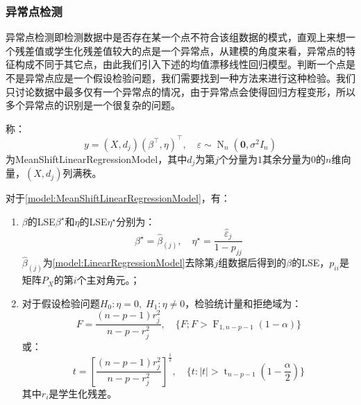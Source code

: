 \subsubsection{异常点检测}
\begin{note}
	异常点检测即检测数据中是否存在某一个点不符合该组数据的模式，直观上来想一个残差值或学生化残差值较大的点是一个异常点，从建模的角度来看，异常点的特征构成不同于其它点，由此我们引入下述的均值漂移线性回归模型。判断一个点是不是异常点应是一个假设检验问题，我们需要找到一种方法来进行这种检验。我们只讨论数据中最多仅有一个异常点的情况，由于异常点会使得回归方程变形，所以多个异常点的识别是一个很复杂的问题。
\end{note}
\begin{definition}\label{model:MeanShiftLinearRegressionModel}
	称：
	\begin{equation*}
		y=(X,d_j)(\beta^{\top},\eta)^{\top},\quad\varepsilon\sim\operatorname{N}_n(\mathbf{0},\sigma^2I_n)
	\end{equation*}
	为\gls{MeanShiftLinearRegressionModel}，其中$d_j$为第$j$个分量为$1$其余分量为$0$的$n$维向量，$(X,d_j)$列满秩。
\end{definition}
\begin{theorem}\label{theo:MeanShiftLinearRegressionModel}
	对于\cref{model:MeanShiftLinearRegressionModel}，有：
	\begin{enumerate}
		\item $\beta$的LSE$\beta^{\star}$和$\eta$的LSE$\eta^{\star}$分别为：
		\begin{equation*}
			\beta^{\star}=\hat{\beta}_{(j)},\quad\eta^{\star}=\frac{\hat{\varepsilon}_j}{1-p_{jj}}
		\end{equation*}
		$\hat{\beta}_{(j)}$为\cref{model:LinearRegressionModel}去除第$j$组数据后得到的$\beta$的LSE，$p_{ii}$是矩阵$P_X$的第$i$个主对角元。；
		\item 对于假设检验问题$H_0:\eta=0,\;H_1:\eta\ne0$，检验统计量和拒绝域为：
		\begin{equation*}
			F=\frac{(n-p-1)r_j^2}{n-p-r_j^2},\quad\{F;F>\operatorname{F}_{1,n-p-1}(1-\alpha)\}
		\end{equation*}
		或：
		\begin{equation*}
			t=\left[\frac{(n-p-1)r_j^2}{n-p-r_j^2}\right]^{\frac{1}{2}},\quad\{t:|t|>\operatorname{t}_{n-p-1}\left(1-\frac{\alpha}{2}\right)\}
		\end{equation*}
		其中$r_i$是学生化残差。
	\end{enumerate}
\end{theorem}
